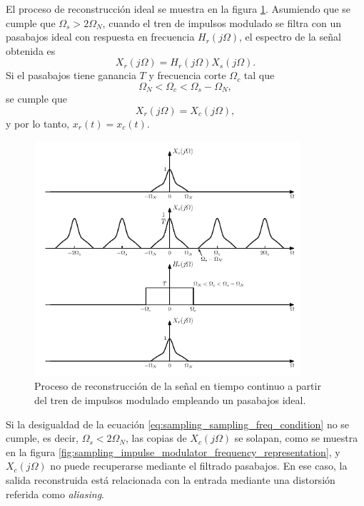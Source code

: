 \documentclass[a4paper]{report}
\begin{document}
El proceso de reconstrucción ideal se muestra en la figura \ref{fig:sampling_impulse_modulator_frequency_representation_reconstruction}. Asumiendo que se cumple que \(\Omega_s>2\Omega_N\), cuando el tren de impulsos modulado se filtra con un pasabajos ideal con respuesta en frecuencia \(H_r(j\Omega)\), el espectro de la señal obtenida es
\[
 X_r(j\Omega)=H_r(j\Omega)X_s(j\Omega).
\]
Si el pasabajos tiene ganancia \(T\) y frecuencia corte \(\Omega_c\) tal que 
\begin{equation}\label{eq:sampling_sampling_freq_condition}
 \Omega_N<\Omega_c<\Omega_s-\Omega_N, 
\end{equation}
se cumple que 
\[
 X_r(j\Omega)=X_c(j\Omega),
\]
y por lo tanto, \(x_r(t)=x_c(t)\).
\begin{figure}[!htb]
 \begin{center}
 \includegraphics[width=0.88\textwidth]{figuras/sampling_impulse_modulator_frequency_representation_reconstruction.pdf}
 \caption{\label{fig:sampling_impulse_modulator_frequency_representation_reconstruction} Proceso de reconstrucción de la señal en tiempo continuo a partir del tren de impulsos modulado empleando un pasabajos ideal.}
 \end{center}
\end{figure}

Si la desigualdad de la ecuación \ref{eq:sampling_sampling_freq_condition} no se cumple, es decir, \(\Omega_s<2\Omega_N\), las copias de \(X_c(j\Omega)\) se solapan, como se muestra en la figura \ref{fig:sampling_impulse_modulator_frequency_representation}, y \(X_c(j\Omega)\) no puede recuperarse mediante el filtrado pasabajos. En ese caso, la salida reconstruida está relacionada con la entrada mediante una distorsión referida como \emph{aliasing}.
\end{document}

